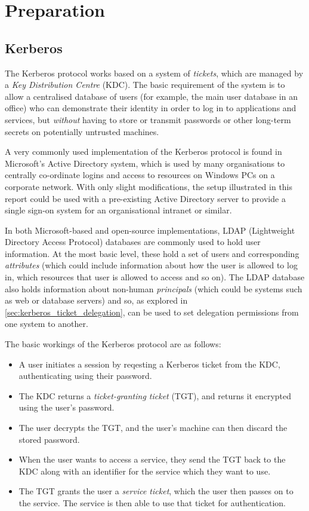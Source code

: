\documentclass{report}
\begin{document}
\chapter{Preparation}

\section{Kerberos}
The Kerberos protocol works based on a system of \textit{tickets}, which are managed by a \textit{Key Distribution Centre} (KDC). The basic requirement of the system is to allow a centralised database of users (for example, the main user database in an office) who can demonstrate their identity in order to log in to applications and services, but \textit{without} having to store or transmit passwords or other long-term secrets on potentially untrusted machines.

A very commonly used implementation of the Kerberos protocol is found in Microsoft's Active Directory system, which is used by many organisations to centrally co-ordinate logins and access to resources on Windows PCs on a corporate network. With only slight modifications, the setup illustrated in this report could be used with a pre-existing Active Directory server to provide a single sign-on system for an organisational intranet or similar.

In both Microsoft-based and open-source implementations, LDAP (Lightweight Directory Access Protocol) databases are commonly used to hold user information. At the most basic level, these hold a set of users and corresponding \textit{attributes} (which could include information about how the user is allowed to log in, which resources that user is allowed to access and so on). The LDAP database also holds information about non-human \textit{principals} (which could be systems such as web or database servers) and so, as explored in \autoref{sec:kerberos_ticket_delegation}, can be used to set delegation permissions from one system to another.

The basic workings of the Kerberos protocol are as follows:

\begin{itemize}
\item
  A user initiates a session by reqesting a Kerberos ticket from the KDC, authenticating using their password.
\item
  The KDC returns a \textit{ticket-granting ticket} (TGT), and returns it encrypted using the user's password.
\item
  The user decrypts the TGT, and the user's machine can then discard the stored password.
\item
  When the user wants to access a service, they send the TGT back to the KDC along with an identifier for the service which they want to use.
\item
  The TGT grants the user a \textit{service ticket}, which the user then passes on to the service. The service is then able to use that ticket for authentication.
\end{itemize}
\end{document}
